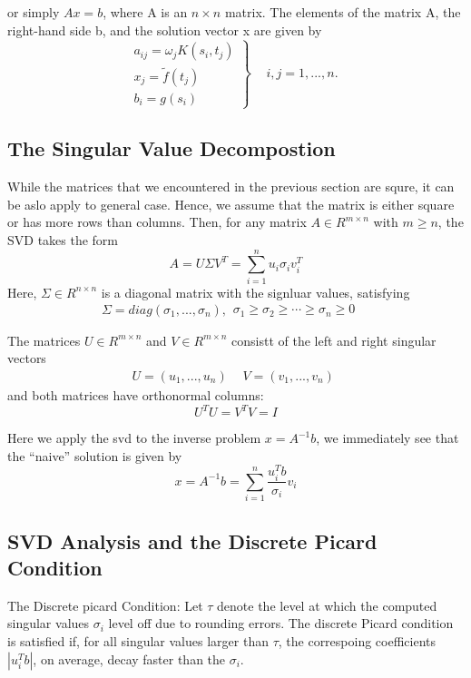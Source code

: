\documentclass{article}
\begin{document}
or simply \(Ax=b\), where A is an \(n \times n\) matrix. The elements of the
matrix A, the right-hand side b, and the solution vector x are given by
\begin{equation}
\left. {\begin{array}{*{20}{c}}
{{a_{ij}} = {\omega _j}K({s_i},{t_j})}\\
{{x_j} = \tilde f({t_j})}\\
{{b_i} = g({s_i})}
\end{array}} \right\}\begin{array}{*{20}{c}}
{}&{i,j = 1,...,n.}
\end{array}
\end{equation}


\subsection{The Singular Value Decompostion}
While the matrices that we encountered in the previous section are squre, it can
be aslo apply to general case. Hence, we  assume that the matrix is either
square or has more rows than columns. Then, for any matrix \(A \in {R^{m \times
n}}\) with \(m \geqslant n\), the SVD takes the form
\begin{equation}
A = U\Sigma {V^T} = \sum\limits_{i = 1}^n {{u_i}{\sigma _i}v_i^T} 
\end{equation}
Here, \(\Sigma  \in {R^{n \times n}}\) is a diagonal matrix with the signluar
values, satisfying
\[\Sigma  = diag({\sigma _1},...,{\sigma _n}),\begin{array}{*{20}{c}}
{{\sigma _1} \ge {\sigma _2} \ge  \cdots  \ge {\sigma _n} \ge 0}&{}
\end{array}\]

The matrices \(U \in {R^{m \times n}}\) and \(V \in {R^{m \times n}}\) consistt
of the left and right singular vectors
\[U = ({u_1},...,{u_n})\begin{array}{*{20}{c}}
{}&{V = ({v_1},...,{v_n})}
\end{array}\]
and both matrices have orthonormal columns:
\[{U^T}U = {V^T}V = I\]

Here we apply the svd to the inverse problem \(x = {A^{ - 1}}b\), we immediately
see that the ``naive'' solution is given by
\begin{equation}
x = {A^{ - 1}}b = \sum\limits_{i = 1}^n {\frac{{u_i^Tb}}{{{\sigma _i}}}}
{v_i}
\end{equation}

\subsection{SVD Analysis and the Discrete Picard Condition}
The Discrete picard Condition: Let \(\tau \) denote the level at which the
computed singular values \({\sigma _i}\) level off due to rounding errors. The
discrete Picard condition is satisfied if, for all singular values larger than
\(\tau \), the correspoing coefficients \(\left| {u_i^Tb} \right|\), on average,
decay faster than the \({\sigma _i}\).
\end{document}
